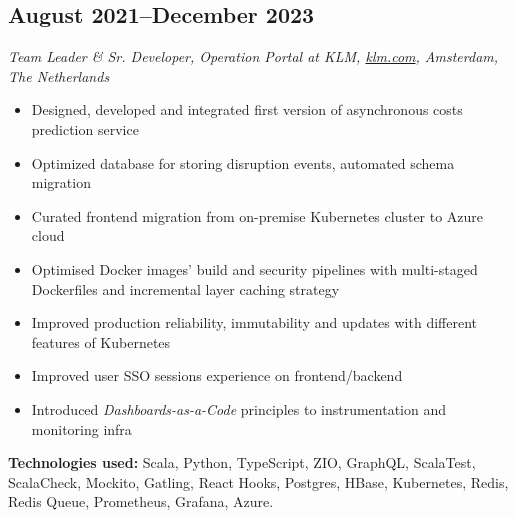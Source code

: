 \subsection*{August 2021--December 2023}

\textit{Team Leader \& Sr. Developer, Operation Portal at KLM, \href{https://klm.com}{\url{klm.com}}, Amsterdam, The Netherlands}

\begin{itemize}[noitemsep]
  \item Designed, developed and integrated first version of asynchronous costs prediction service
  \item Optimized database for storing disruption events, automated schema migration
  \item Curated frontend migration from on-premise Kubernetes cluster to Azure cloud
  \item Optimised Docker images' build and security pipelines with multi-staged Dockerfiles and incremental layer caching strategy
  \item Improved production reliability, immutability and updates with different features of Kubernetes
  \item Improved user SSO sessions experience on frontend/backend
  \item Introduced \textit{Dashboards-as-a-Code} principles to instrumentation and monitoring infra
\end{itemize}

\textbf{Technologies used:}
Scala, Python, TypeScript, ZIO, GraphQL,
ScalaTest, ScalaCheck, Mockito, Gatling, React Hooks, Postgres, HBase, Kubernetes,
Redis, Redis Queue, Prometheus, Grafana, Azure.
